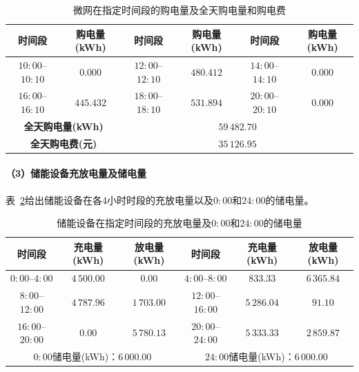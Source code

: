 \documentclass[12pt,a4paper]{ctexart}
\theoremstyle{definition}
\theoremstyle{plain}
\theoremstyle{remark}
\begin{document}
\begin{table}[H]
\centering
\caption{微网在指定时间段的购电量及全天购电量和购电费}
\label{tab:q1_purchase_specified}
\begin{tabular}{cc|cc|cc}
\toprule
\textbf{时间段} & \textbf{购电量(kWh)} & \textbf{时间段} & \textbf{购电量(kWh)} & \textbf{时间段} & \textbf{购电量(kWh)} \\
\midrule
$10{:}00$--$10{:}10$ & $0.000$ & $12{:}00$--$12{:}10$ & $480.412$ & $14{:}00$--$14{:}10$ & $0.000$ \\
$16{:}00$--$16{:}10$ & $445.432$ & $18{:}00$--$18{:}10$ & $531.894$ & $20{:}00$--$20{:}10$ & $0.000$ \\
\midrule
\multicolumn{2}{c|}{\textbf{全天购电量(kWh)}} & \multicolumn{4}{c}{$59\,482.70$} \\
\multicolumn{2}{c|}{\textbf{全天购电费(元)}} & \multicolumn{4}{c}{$35\,126.95$} \\
\bottomrule
\end{tabular}
\end{table}

\paragraph{（3）储能设备充放电量及储电量}

表~\ref{tab:q1_storage}给出储能设备在各4小时时段的充放电量以及$0{:}00$和$24{:}00$的储电量。

\begin{table}[H]
\centering
\caption{储能设备在指定时间段的充放电量及$0{:}00$和$24{:}00$的储电量}
\label{tab:q1_storage}
\begin{tabular}{ccc|ccc}
\toprule
\textbf{时间段} & \textbf{充电量(kWh)} & \textbf{放电量(kWh)} & \textbf{时间段} & \textbf{充电量(kWh)} & \textbf{放电量(kWh)} \\
\midrule
$0{:}00$--$4{:}00$   & $4\,500.00$ & $0.00$      & $4{:}00$--$8{:}00$   & $833.33$    & $6\,365.84$ \\
$8{:}00$--$12{:}00$  & $4\,787.96$ & $1\,703.00$ & $12{:}00$--$16{:}00$ & $5\,286.04$ & $91.10$     \\
$16{:}00$--$20{:}00$ & $0.00$      & $5\,780.13$ & $20{:}00$--$24{:}00$ & $5\,333.33$ & $2\,859.87$ \\
\midrule
\multicolumn{3}{c|}{$0{:}00$储电量\;(kWh)：$6\,000.00$} & \multicolumn{3}{c}{$24{:}00$储电量\;(kWh)：$6\,000.00$} \\
\bottomrule
\end{tabular}
\end{table}
\end{document}
